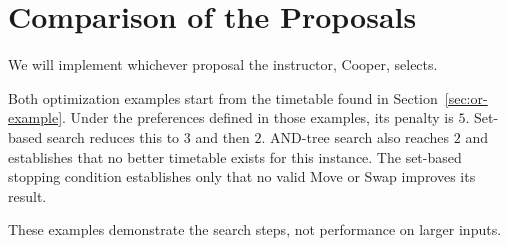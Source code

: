 \section{Comparison of the Proposals}
\label{sec:integration}

We will implement whichever proposal the instructor, Cooper, selects.

Both optimization examples start from the timetable found
in Section~\ref{sec:or-example}. Under the preferences defined
in those examples, its penalty is $5$. Set-based search
reduces this to $3$ and then $2$. AND-tree search also reaches
$2$ and establishes that no better timetable exists for this
instance. The set-based stopping condition establishes only
that no valid Move or Swap improves its result.

These examples demonstrate the search steps, not performance
on larger inputs.